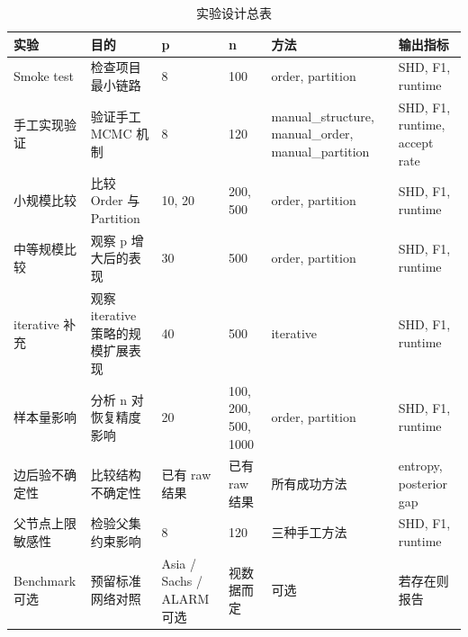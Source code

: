 \begin{table}[H]
\centering
\small
\setlength{\tabcolsep}{2pt}
\caption{实验设计总表}
\label{tab:experiment_design}
\begin{tabular}{p{1.8cm}p{2.8cm}p{2.0cm}p{2.2cm}p{2.7cm}p{2.5cm}}
\toprule
实验 & 目的 & p & n & 方法 & 输出指标
\\
\midrule
Smoke test & 检查项目最小链路 & 8 & 100 & order, partition & SHD, F1, runtime \\
手工实现验证 & 验证手工 MCMC 机制 & 8 & 120 & manual\_structure, manual\_order, manual\_partition & SHD, F1, runtime, accept rate \\
小规模比较 & 比较 Order 与 Partition & 10, 20 & 200, 500 & order, partition & SHD, F1, runtime \\
中等规模比较 & 观察 p 增大后的表现 & 30 & 500 & order, partition & SHD, F1, runtime \\
iterative 补充 & 观察 iterative 策略的规模扩展表现 & 40 & 500 & iterative & SHD, F1, runtime \\
样本量影响 & 分析 n 对恢复精度影响 & 20 & 100, 200, 500, 1000 & order, partition & SHD, F1, runtime \\
边后验不确定性 & 比较结构不确定性 & 已有 raw 结果 & 已有 raw 结果 & 所有成功方法 & entropy, posterior gap \\
父节点上限敏感性 & 检验父集约束影响 & 8 & 120 & 三种手工方法 & SHD, F1, runtime \\
Benchmark 可选 & 预留标准网络对照 & Asia / Sachs / ALARM 可选 & 视数据而定 & 可选 & 若存在则报告 \\
\bottomrule
\end{tabular}
\end{table}
